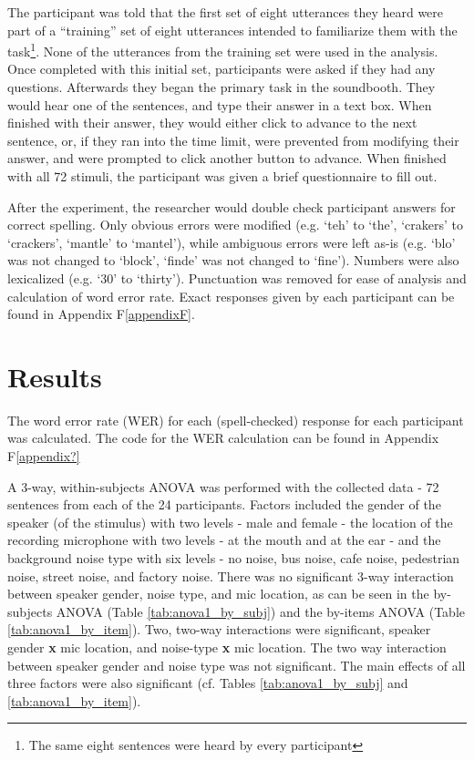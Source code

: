 \documentclass[dissertation,copyright]{uathesis}
\begin{document}
The participant was told that the first set of eight utterances they heard were part of a ``training'' set of eight utterances intended to familiarize them with the task\footnote{The same eight sentences were heard by every participant}.  None of the utterances from the training set were used in the analysis.  Once completed with this initial set, participants were asked if they had any questions.  Afterwards they began the primary task in the soundbooth.  They would hear one of the sentences, and type their answer in a text box.  When finished with their answer, they would either click to advance to the next sentence, or, if they ran into the time limit, were prevented from modifying their answer, and were prompted to click another button to advance.  When finished with all 72 stimuli, the participant was given a brief questionnaire to fill out.  

After the experiment, the researcher would double check participant answers for correct spelling.  Only obvious errors were modified (e.g. `teh' to `the', `crakers' to `crackers', `mantle' to `mantel'), while ambiguous errors were left as-is (e.g. `blo' was not changed to `block', `finde' was not changed to `fine').  Numbers were also lexicalized (e.g. `30' to `thirty').  Punctuation was removed for ease of analysis and calculation of word error rate.  Exact responses given by each participant can be found in Appendix F\ref{appendixF}.


\section{Results}
\label{ch4:results}



The word error rate (WER) for each (spell-checked) response for each participant was calculated. The code for the WER calculation can be found in Appendix F\ref{appendix?}

A 3-way, within-subjects ANOVA was performed with the collected data - 72 sentences from each of the 24 participants. Factors included the gender of the speaker (of the stimulus) with two levels - male and female - the location of the recording microphone with two levels - at the mouth and at the ear - and the background noise type with six levels - no noise, bus noise, cafe noise, pedestrian noise, street noise, and factory noise.  There was no significant 3-way interaction between speaker gender, noise type, and mic location, as can be seen in the by-subjects ANOVA (Table \ref{tab:anova1_by_subj}) and the by-items ANOVA (Table \ref{tab:anova1_by_item}). Two, two-way interactions were significant, speaker gender \textbf{x} mic location, and noise-type \textbf{x} mic location. The two way interaction between speaker gender and noise type was not significant.  The main effects of all three factors were also significant (cf. Tables \ref{tab:anova1_by_subj} and \ref{tab:anova1_by_item}).
\end{document}
